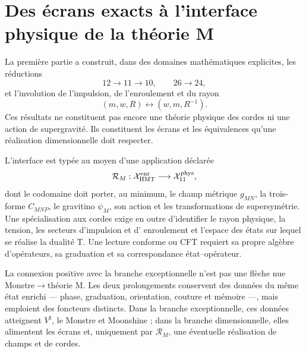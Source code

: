 \section{Des écrans exacts à l'interface physique de la théorie M}
\label{sec:interfaz-teoria-m-rev8}

La première partie a construit, dans des domaines mathématiques explicites, les
réductions
\[
12\longrightarrow11\longrightarrow10,
\qquad
26\longrightarrow24,
\]
et l'involution de l'impulsion, de l'enroulement et du rayon
\[
(m,w,R)\longleftrightarrow(w,m,R^{-1}).
\]
Ces résultats ne constituent pas encore une théorie physique des cordes ni une action
de supergravité. Ils constituent les écrans et les équivalences qu'une
réalisation dimensionnelle doit respecter.

L'interface est typée au moyen d'une application déclarée
\[
\mathcal R_M:\mathcal X_{\rm HMT}^{\rm enr}
\longrightarrow
\mathcal X_{11}^{\rm phys},
\]
dont le codomaine doit porter, au minimum, le champ métrique \(g_{MN}\), la
trois-forme \(C_{MNP}\), le gravitino \(\psi_M\), son action et les
transformations de supersymétrie. Une spécialisation aux cordes exige
en outre d'identifier le rayon physique, la tension, les secteurs d'impulsion et d'
enroulement et l'espace des états sur lequel se réalise la dualité
T. Une lecture conforme ou CFT requiert sa propre algèbre d'opérateurs,
sa graduation et sa correspondance état--opérateur.

La connexion positive avec la branche exceptionnelle n'est pas une flèche nue
Monstre\(\to\)théorie M. Les deux prolongements conservent des données du même
état enrichi --- phase, graduation, orientation, couture et mémoire ---,
mais emploient des foncteurs distincts. Dans la branche exceptionnelle, ces données atteignent
\(V^\natural\), le Monstre et Moonshine ; dans la branche dimensionnelle, elles alimentent
les écrans et, uniquement par \(\mathcal R_M\), une éventuelle réalisation de
champs et de cordes.

